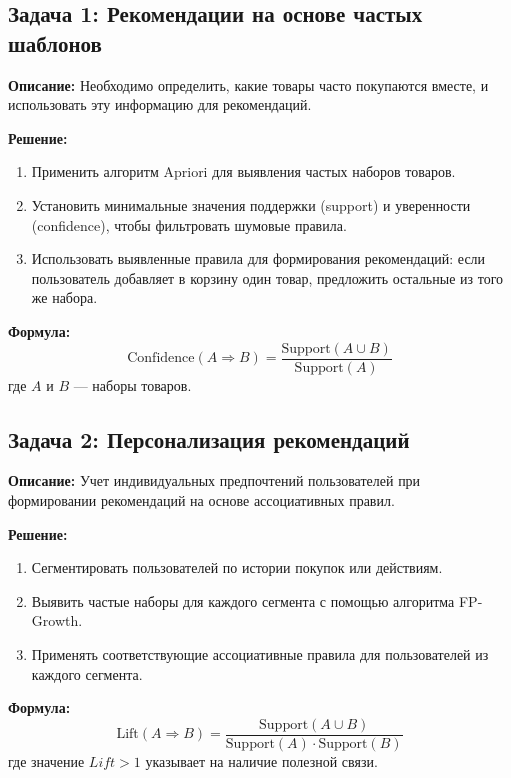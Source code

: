 \subsection{Задача 1: Рекомендации на основе частых шаблонов}
\textbf{Описание:}
Необходимо определить, какие товары часто покупаются вместе, и использовать эту информацию для рекомендаций.

\textbf{Решение:}
\begin{enumerate}
    \item Применить алгоритм Apriori для выявления частых наборов товаров.
    \item Установить минимальные значения поддержки (support) и уверенности (confidence), чтобы фильтровать шумовые правила.
    \item Использовать выявленные правила для формирования рекомендаций: если пользователь добавляет в корзину один товар, предложить остальные из того же набора.
\end{enumerate}

\textbf{Формула:}
\begin{equation}
    \text{Confidence}(A \Rightarrow B) = \frac{\text{Support}(A \cup B)}{\text{Support}(A)}
\end{equation}
где $A$ и $B$ — наборы товаров.

\subsection{Задача 2: Персонализация рекомендаций}
\textbf{Описание:}
Учет индивидуальных предпочтений пользователей при формировании рекомендаций на основе ассоциативных правил.

\textbf{Решение:}
\begin{enumerate}
    \item Сегментировать пользователей по истории покупок или действиям.
    \item Выявить частые наборы для каждого сегмента с помощью алгоритма FP-Growth.
    \item Применять соответствующие ассоциативные правила для пользователей из каждого сегмента.
\end{enumerate}

\textbf{Формула:}
\begin{equation}
    \text{Lift}(A \Rightarrow B) = \frac{\text{Support}(A \cup B)}{\text{Support}(A) \cdot \text{Support}(B)}
\end{equation}
где значение $Lift > 1$ указывает на наличие полезной связи.

